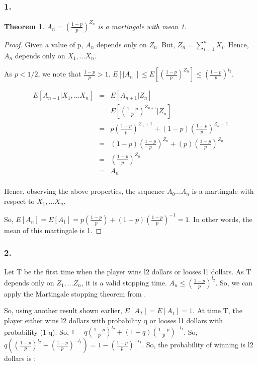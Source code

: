 \documentclass[10pt]{amsart}
\newtheorem{thm}{Theorem}[subsection]
\theoremstyle{remark}
\begin{document}
\subsubsection{1.}
\begin{thm}
$A_{n}=(\frac{1-p}{p})^{Z_{n}}$ is a martingale with mean 1.
\end{thm}
\begin{proof}
Given a value of p, $A_{n}$ depends only on $Z_{n}$. But, $Z_{n} = \sum_{i=1}^{n} X_{i}$. Hence, $A_{n}$ depends only on $X_{1}, \dots X_{n}$.

As $p<1/2$, we note that $\frac{1-p}{p} > 1$. $E[|A_{n}|] \leq E[(\frac{1-p}{p})^{Z_{n}}] \leq (\frac{1-p}{p})^{l_{2}}$.

\begin{eqnarray*}
E[A_{n+1}|X_{1}, \dots X_{n}] &=& E[A_{n+1}|Z_{n}] \\
&=& E[(\frac{1-p}{p})^{Z_{n+1}}|Z_{n}] \\
&=& p(\frac{1-p}{p})^{Z_{n}+1} + (1-p)(\frac{1-p}{p})^{Z_{n}-1}\\
&=& (1-p)(\frac{1-p}{p})^{Z_{n}} + (p)(\frac{1-p}{p})^{Z_{n}}\\
&=& (\frac{1-p}{p})^{Z_{n}}\\
&=& A_{n}\\
\end{eqnarray*} 

Hence, observing the above properties, the sequence $A_{0} \dots A_{n}$ is a martingale with respect to $X_{1}, \dots X_{n}$.

So, $E[A_{n}] = E[A_{1}] = p(\frac{1-p}{p}) + (1-p)(\frac{1-p}{p})^{-1} = 1$. In other words, the mean of this martingale is 1.
\end{proof}

\subsubsection{2.}
Let T be the first time when the player wins l2 dollars or looses l1 dollars. As T depends only on $Z_{1}, \dots Z_{n}$, it is a valid stopping time. $A_{n} \leq (\frac{1-p}{p})^{l_{2}}$. So, we can apply the Martingale stopping theorem from \cite{mitzenmacherUpfal}.

So, using another result shown earlier, $E[A_{T}] = E[A_{1}] = 1$. At time T, the player either wins l2 dollars with probability q or looses l1 dollars with probability (1-q). So, $1 = q(\frac{1-p}{p})^{l_{2}} + (1-q)(\frac{1-p}{p})^{-l_{1}}$. So, $q((\frac{1-p}{p})^{l_{2}} - (\frac{1-p}{p})^{-l_{1}}) = 1 - (\frac{1-p}{p})^{-l_{1}}$. So, the probability of winning is l2 dollars is :
\end{document}
